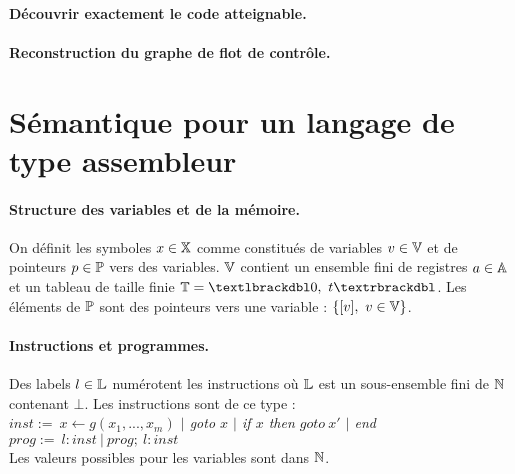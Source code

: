 
\paragraph{Découvrir exactement le code atteignable.}

\paragraph{Reconstruction du graphe de flot de contrôle.}

\section{Sémantique pour un langage de type assembleur}

\paragraph{Structure des variables et de la mémoire.}

\begin{defi}
On définit les symboles $x\in\mathbb X$ comme constitués de variables $v\in\mathbb V$ et de pointeurs $p\in\mathbb P$ vers des variables. $\mathbb V$ contient un ensemble fini de registres $a\in\mathbb A$ et un tableau de taille finie $\mathbb{T}=\textlbrackdbl 0,\ t\textrbrackdbl$. Les éléments de $\mathbb P$ sont des pointeurs vers une variable : $\{[v],\ v\in \mathbb V\}$.
\end{defi}


\paragraph{Instructions et programmes.}
\begin{defi}
Des labels $l\in\mathbb L$ numérotent les instructions où $\mathbb L$ est un sous-ensemble fini de $\mathbb N$ contenant $\bot$. Les instructions sont de ce type : \\
$inst:=\ $\emph{$x\leftarrow g(x_1, ..., x_m)$ $|$ goto $x$ $|$ if $x$ then $goto\ x'$ $|$ end}\\
$prog:=\ $\emph{$l:inst\ |\ prog;\ l:inst$}\\
Les valeurs possibles pour les variables sont dans $\mathbb N$.
\end{defi}

